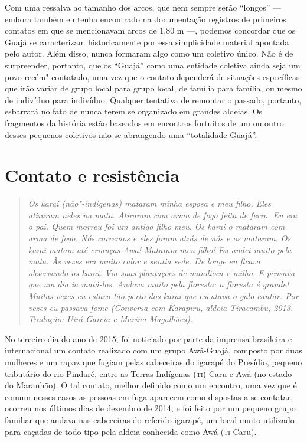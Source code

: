 Com uma ressalva ao tamanho dos arcos, que nem sempre serão ``longos'' ---
embora também eu tenha encontrado na documentação registros de primeiros
contatos em que se mencionavam arcos de 1,80 m ---, podemos concordar que
os Guajá se caracterizam historicamente por essa simplicidade material
apontada pelo autor. Além disso, nunca formaram algo como um coletivo
único. Não é de surpreender, portanto, que os ``Guajá'' como uma entidade
coletiva ainda seja um povo recém"-contatado, uma vez que o contato
dependerá de situações específicas que irão variar de grupo local para
grupo local, de família para família, ou mesmo de indivíduo para
indivíduo. Qualquer tentativa de remontar o passado, portanto, esbarrará
no fato de nunca terem se organizado em grandes aldeias. Os fragmentos
da história estão baseados em encontros fortuitos de um ou outro desses
pequenos coletivos não se abrangendo uma ``totalidade Guajá''.

\section{Contato e resistência}

\begin{quote}
\emph{Os karai (não"-indígenas) mataram minha esposa e meu filho. Eles
atiraram neles na mata. Atiraram com arma de fogo feita de ferro. Eu era
o pai. Quem morreu foi um antigo filho meu. Os karai o mataram com arma
de fogo. Nós corremos e eles foram atrás de nós e os mataram. Os karai
matam até crianças Awa! Mataram meu filho! Eu andei muito pela mata. Às
vezes era muito calor e sentia sede. De longe eu ficava observando os
karai. Via suas plantações de mandioca e milho. E pensava que um dia ia
matá-los. Andava muito pela floresta: a floresta é grande! Muitas vezes
eu estava tão perto dos karai que escutava o galo cantar. Por vezes eu
passava fome (Conversa com Karapiru, aldeia Tiracambu, 2013.
Tradução: Uirá Garcia e Marina Magalhães).}
\end{quote}

No terceiro dia do ano de 2015, foi noticiado por parte da imprensa
brasileira e internacional um contato realizado com um grupo Awá-Guajá,
composto por duas mulheres e um rapaz que fugiam pelas cabeceiras do
igarapé do Presídio, pequeno tributário do rio Pindaré, entre as Terras
Indígenas (\textsc{ti}) Caru e Awá (no estado do Maranhão). O tal contato, melhor
definido como um encontro, uma vez que é comum nesses casos as
pessoas em fuga aparecem como dispostas a se contatar, ocorreu nos
últimos dias de dezembro de 2014, e foi feito por um pequeno grupo
familiar que andava nas cabeceiras do referido igarapé, um local muito
utilizado para caçadas de todo tipo pela aldeia conhecida como Awá (\textsc{ti}
Caru).

